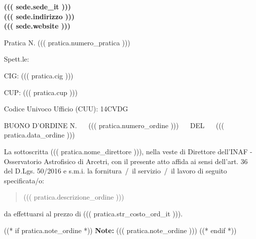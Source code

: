 \documentclass[a4paper,12pt]{letter}
\begin{document}
\vspace{-2.5cm}
\begin{center}
\small \bf
((( sede.sede_it ))) \\
((( sede.indirizzo )))  \\
((( sede.website )))
\end{center}
\thispagestyle{empty}
\vspace{1cm}
{\small Pratica N. ((( pratica.numero_pratica ))) }
\vspace{.4cm}

\begin{flushright}
\begin{minipage}{10cm}
Spett.le:\\
\end{minipage}
\end{flushright}
\vspace{5mm}

CIG: ((( pratica.cig ))) 

CUP: ((( pratica.cup )))

Codice Univoco Ufficio (CUU): 14CVDG

BUONO D'ORDINE N. ~~ ((( pratica.numero_ordine ))) ~~ DEL ~~ ((( pratica.data_ordine )))

La sottoscritta ((( pratica.nome_direttore ))), 
nella veste di Direttore dell'INAF - Osservatorio Astrofisico di Arcetri,
con il presente atto affida ai sensi dell'art. 36 del D.Lgs. 50/2016 e s.m.i.
la fornitura~/~il servizio~/~il lavoro di seguito specificata/o:

\begin{quote}
((( pratica.descrizione_ordine )))
\end{quote}

da effettuarsi al prezzo di ((( pratica.str_costo_ord_it ))).

((* if pratica.note_ordine *))
{\bf Note:} ((( pratica.note_ordine )))
((* endif *))
\vspace{1cm}
\end{document}
